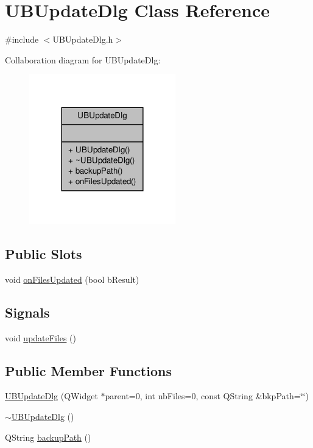 \hypertarget{class_u_b_update_dlg}{\section{U\-B\-Update\-Dlg Class Reference}
\label{d0/d4f/class_u_b_update_dlg}
}


{\ttfamily \#include $<$U\-B\-Update\-Dlg.\-h$>$}



Collaboration diagram for U\-B\-Update\-Dlg\-:
\nopagebreak
\begin{figure}[H]
\begin{center}
\leavevmode
\includegraphics[width=180pt]{da/d2c/class_u_b_update_dlg__coll__graph}
\end{center}
\end{figure}
\subsection*{Public Slots}
\begin{DoxyCompactItemize}
\item 
void \hyperlink{class_u_b_update_dlg_a2f61a149763a1d402e1b06eae7ab4d54}{on\-Files\-Updated} (bool b\-Result)
\end{DoxyCompactItemize}
\subsection*{Signals}
\begin{DoxyCompactItemize}
\item 
void \hyperlink{class_u_b_update_dlg_a011d0dfa4661a653e9cd65cc563a6a53}{update\-Files} ()
\end{DoxyCompactItemize}
\subsection*{Public Member Functions}
\begin{DoxyCompactItemize}
\item 
\hyperlink{class_u_b_update_dlg_abd417884a0f3eb0e271948962e068b2c}{U\-B\-Update\-Dlg} (Q\-Widget $\ast$parent=0, int nb\-Files=0, const Q\-String \&bkp\-Path=\char`\"{}\char`\"{})
\item 
\hyperlink{class_u_b_update_dlg_ae32bbfe5e12f19a437662d0ea4769704}{$\sim$\-U\-B\-Update\-Dlg} ()
\item 
Q\-String \hyperlink{class_u_b_update_dlg_a0b0302a432ab7ae868db31f23d3d9da2}{backup\-Path} ()
\end{DoxyCompactItemize}


